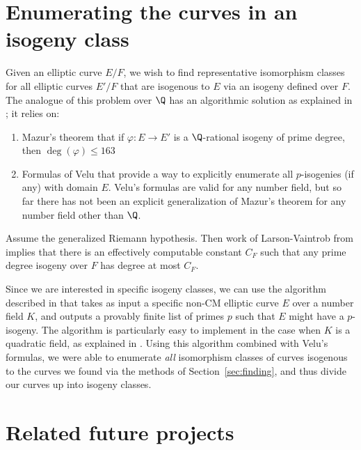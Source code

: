 \documentclass{amsart}
\begin{document}
\section{Enumerating the curves in an isogeny class}\label{sec:isoclass}

Given an elliptic curve $E/F$, we wish to find representative
isomorphism classes for all elliptic curves $E'/F$ that are isogenous
to $E$ via an isogeny defined over $F$. The analogue of this problem
over $\Q$ has an algorithmic solution as explained in
\cite[\S3.8]{cremona:algs}; it relies on:
\begin{enumerate}
\item  Mazur's theorem \cite{mazur:rational} 
that if $\varphi:E\to E'$ is a $\Q$-rational isogeny of prime degree, 
then $\deg(\varphi)\leq 163$
\item Formulas of Velu \cite{velu:isogenies} 
that provide a way to explicitly enumerate all $p$-isogenies (if any) with domain $E$.  
Velu's formulas are valid for any number field, but so far there has not been an explicit
generalization of Mazur's theorem for any number field other than $\Q$. 
\end{enumerate}

\begin{remark}
  Assume the generalized Riemann hypothesis.  Then work of Larson-Vaintrob 
  from \cite{larson-vaintrob} implies that there is an effectively computable constant $C_F$ 
  such that any prime degree isogeny over $F$ has degree at most $C_F$.
\end{remark}

Since we are interested in specific isogeny classes, 
we can use the algorithm described in \cite{billerey:isog} that takes as
input a specific non-CM elliptic curve $E$ over a number field $K$, and
outputs a provably finite list of primes $p$ such that $E$ might have a
$p$-isogeny. The algorithm is particularly easy to implement in the
case when $K$ is a quadratic field, as explained in
\cite[\S2.3.4]{billerey:isog}.  Using this algorithm combined with
Velu's formulas, we were able to enumerate {\em all}
isomorphism classes of curves isogenous to the curves we found via the
methods of Section~\ref{sec:finding}, and thus divide our curves up into
isogeny classes.


\section{Related future projects}\label{sec:future}
\end{document}
